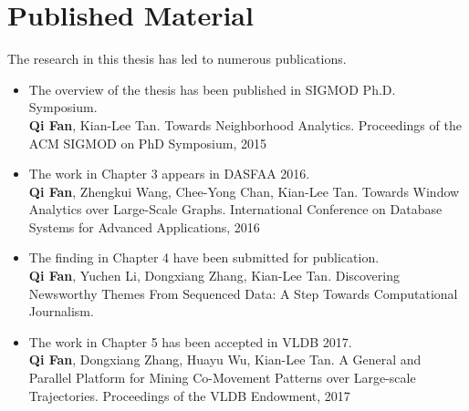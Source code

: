 \section{Published Material}
The research in this thesis has led to numerous publications. 

\begin{itemize}
	\item{The overview of the thesis has been published in SIGMOD Ph.D. Symposium.\\
		\textbf{Qi Fan}, Kian-Lee Tan. Towards Neighborhood Analytics. Proceedings of the ACM SIGMOD on PhD Symposium, 2015
	}
	\item{The work in Chapter 3 appears in DASFAA 2016.\\
		\textbf{Qi Fan}, Zhengkui Wang, Chee-Yong Chan, Kian-Lee Tan. Towards Window Analytics over Large-Scale Graphs. International Conference on Database Systems for Advanced Applications, 2016
	}
	\item{The finding in Chapter 4 have been submitted for publication.\\
		\textbf{Qi Fan}, Yuchen Li, Dongxiang Zhang, Kian-Lee Tan. Discovering Newsworthy Themes From Sequenced Data: A Step Towards Computational Journalism.
	}
	\item{The work in Chapter 5 has been accepted in VLDB 2017.\\
		\textbf{Qi Fan}, Dongxiang Zhang, Huayu Wu, Kian-Lee Tan. A General and Parallel Platform for Mining Co-Movement Patterns over Large-scale Trajectories. Proceedings of the VLDB Endowment, 2017
	}	
\end{itemize}

%
%
%
%
%
%
